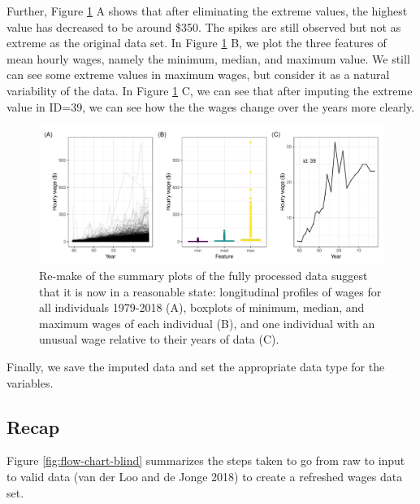\documentclass{article}
\begin{document}
Further, Figure \ref{fig:fixed-feature-plot} A shows that after eliminating the extreme values, the highest value has decreased to be around \$350. The spikes are still observed but not as extreme as the original data set. In Figure \ref{fig:fixed-feature-plot} B, we plot the three features of mean hourly wages, namely the minimum, median, and maximum value.
We still can see some extreme values in maximum wages, but consider it as a natural variability of the data. In Figure \ref{fig:fixed-feature-plot} C, we can see that after imputing the extreme value in ID=39, we can see how the the wages change over the years more clearly.

\begin{figure}

{\centering \includegraphics[width=1\linewidth]{figures/fixed-feature-plot-1} 

}

\caption{Re-make of the summary plots of the fully processed data suggest that it is now in a reasonable state: longitudinal profiles of wages for all individuals 1979-2018 (A), boxplots of minimum, median, and maximum wages of each individual (B), and one individual with an unusual wage relative to their years of data (C). }\label{fig:fixed-feature-plot}
\end{figure}

Finally, we save the imputed data and set the appropriate data type for the variables.

\hypertarget{recap}{%
\subsection{Recap}\label{recap}}

Figure \ref{fig:flow-chart-blind} summarizes the steps taken to go from raw to input to valid data (van der Loo and de Jonge 2018) to create a refreshed wages data set.
\end{document}
